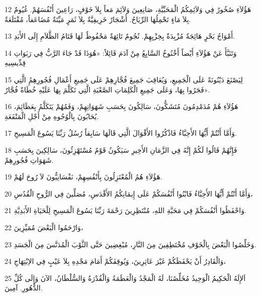 \par 12 هَؤُلاَءِ صُخُورٌ فِي وَلاَئِمِكُمُ الْمَحَبِّيَّةِ، صَانِعِينَ وَلاَئِمَ مَعاً بِلاَ خَوْفٍ، رَاعِينَ أَنْفُسَهُمْ. غُيُومٌ بِلاَ مَاءٍ تَحْمِلُهَا الرِّيَاحُ. أَشْجَارٌ خَرِيفِيَّةٌ بِلاَ ثَمَرٍ مَيِّتَةٌ مُضَاعَفاً، مُقْتَلَعَةٌ.
\par 13 أَمْوَاجُ بَحْرٍ هَائِجَةٌ مُزْبِدَةٌ بِخِزْيِهِمْ. نُجُومٌ تَائِهَةٌ مَحْفُوظٌ لَهَا قَتَامُ الظَّلاَمِ إِلَى الأَبَدِ.
\par 14 وَتَنَبَّأَ عَنْ هَؤُلاَءِ أَيْضاً أَخْنُوخُ السَّابِعُ مِنْ آدَمَ قَائِلاً: «هُوَذَا قَدْ جَاءَ الرَّبُّ فِي رَبَوَاتِ قِدِّيسِيهِ
\par 15 لِيَصْنَعَ دَيْنُونَةً عَلَى الْجَمِيعِ، وَيُعَاقِبَ جَمِيعَ فُجَّارِهِمْ عَلَى جَمِيعِ أَعْمَالِ فُجُورِهِمُِ الَّتِي فَجَرُوا بِهَا، وَعَلَى جَمِيعِ الْكَلِمَاتِ الصَّعْبَةِ الَّتِي تَكَلَّمَ بِهَا عَلَيْهِ خُطَاةٌ فُجَّارٌ».
\par 16 هَؤُلاَءِ هُمْ مُدَمْدِمُونَ مُتَشَكُّونَ، سَالِكُونَ بِحَسَبِ شَهَوَاتِهِمْ، وَفَمُهُمْ يَتَكَلَّمُ بِعَظَائِمَ، يُحَابُونَ بِالْوُجُوهِ مِنْ أَجْلِ الْمَنْفَعَةِ.
\par 17 وَأَمَّا أَنْتُمْ أَيُّهَا الأَحِبَّاءُ فَاذْكُرُوا الأَقْوَالَ الَّتِي قَالَهَا سَابِقاً رُسُلُ رَبِّنَا يَسُوعَ الْمَسِيحِ.
\par 18 فَإِنَّهُمْ قَالُوا لَكُمْ إِنَّهُ فِي الزَّمَانِ الأَخِيرِ سَيَكُونُ قَوْمٌ مُسْتَهْزِئُونَ، سَالِكِينَ بِحَسَبِ شَهَوَاتِ فُجُورِهِمْ.
\par 19 هَؤُلاَءِ هُمُ الْمُعْتَزِلُونَ بِأَنْفُسِهِمْ، نَفْسَانِيُّونَ لاَ رُوحَ لَهُمْ.
\par 20 وَأَمَّا أَنْتُمْ أَيُّهَا الأَحِبَّاءُ فَابْنُوا أَنْفُسَكُمْ عَلَى إِيمَانِكُمُ الأَقْدَسِ، مُصَلِّينَ فِي الرُّوحِ الْقُدُسِ،
\par 21 وَاحْفَظُوا أَنْفُسَكُمْ فِي مَحَبَّةِ اللهِ، مُنْتَظِرِينَ رَحْمَةَ رَبِّنَا يَسُوعَ الْمَسِيحِ لِلْحَيَاةِ الأَبَدِيَّةِ.
\par 22 وَارْحَمُوا الْبَعْضَ مُمَيِّزِينَ،
\par 23 وَخَلِّصُوا الْبَعْضَ بِالْخَوْفِ مُخْتَطِفِينَ مِنَ النَّارِ، مُبْغِضِينَ حَتَّى الثَّوْبَ الْمُدَنَّسَ مِنَ الْجَسَدِ.
\par 24 وَالْقَادِرُ أَنْ يَحْفَظَكُمْ غَيْرَ عَاثِرِينَ، وَيُوقِفَكُمْ أَمَامَ مَجْدِهِ بِلاَ عَيْبٍ فِي الاِبْتِهَاجِ،
\par 25 اَلإِلَهُ الْحَكِيمُ الْوَحِيدُ مُخَلِّصُنَا، لَهُ الْمَجْدُ وَالْعَظَمَةُ وَالْقُدْرَةُ وَالسُّلْطَانُ، الآنَ وَإِلَى كُلِّ الدُّهُورِ. آمِينَ.

